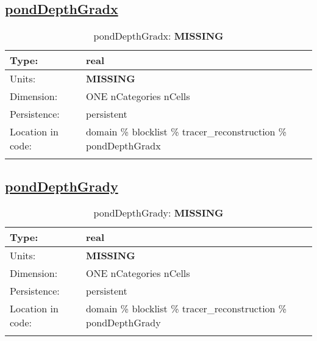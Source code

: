 \subsection[pondDepthGradx]{\hyperref[sec:var_tab_tracer_reconstruction]{pondDepthGradx}}
\label{subsec:var_sec_tracer_reconstruction_pondDepthGradx}
\begin{center}
\begin{longtable}{| p{2.0in} | p{4.0in} |}
        \hline 
        Type: & real \\
        \hline 
        Units: & {\bf \color{red} MISSING} \\
        \hline 
        Dimension: & ONE nCategories nCells \\
        \hline 
        Persistence: & persistent \\
        \hline 
         Location in code: & domain \% blocklist \% tracer\_reconstruction \% pondDepthGradx \\
         \hline 
    \caption{pondDepthGradx: {\bf \color{red} MISSING}}
\end{longtable}
\end{center}
\subsection[pondDepthGrady]{\hyperref[sec:var_tab_tracer_reconstruction]{pondDepthGrady}}
\label{subsec:var_sec_tracer_reconstruction_pondDepthGrady}
\begin{center}
\begin{longtable}{| p{2.0in} | p{4.0in} |}
        \hline 
        Type: & real \\
        \hline 
        Units: & {\bf \color{red} MISSING} \\
        \hline 
        Dimension: & ONE nCategories nCells \\
        \hline 
        Persistence: & persistent \\
        \hline 
         Location in code: & domain \% blocklist \% tracer\_reconstruction \% pondDepthGrady \\
         \hline 
    \caption{pondDepthGrady: {\bf \color{red} MISSING}}
\end{longtable}
\end{center}
